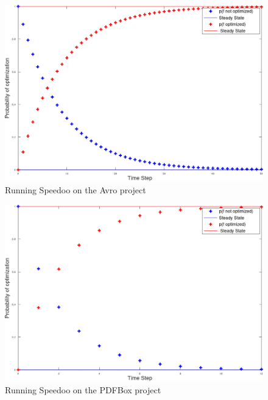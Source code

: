\documentclass[11pt]{article}
\begin{document}
\begin{figure}[!htbp]
\centering
\includegraphics[scale=0.6]{speedoo-avro.png}
\caption{Running Speedoo on the Avro project}
\label{fig:speedoo-avro}
\end{figure}

\begin{figure}[!htbp]
\centering
\includegraphics[scale=0.6]{speedoo-pdfbox.png}
\caption{Running Speedoo on the PDFBox project}
\label{fig:speedoo-pdfbox}
\end{figure}
\end{document}
